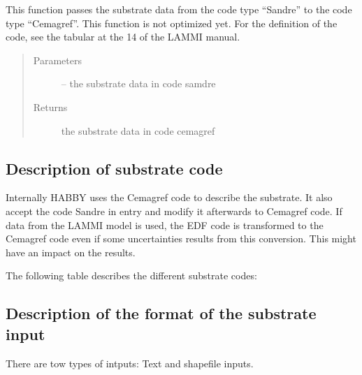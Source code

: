 \documentclass[letterpaper,10pt,english]{sphinxmanual}
\begin{document}

\begin{fulllineitems}
\label{\detokenize{index:src.substrate.sandre_to_cemagref}}
This function passes the substrate data from the code type ``Sandre'' to the code type ``Cemagref''. This function is
not optimized yet. For the definition of the code, see the tabular at the 14 of the LAMMI manual.
\begin{quote}\begin{description}
\item[{Parameters}] \leavevmode
{} -- the substrate data in code samdre

\item[{Returns}] \leavevmode
the substrate data in code cemagref

\end{description}\end{quote}

\end{fulllineitems}



\subsection{Description of substrate code}
\label{\detokenize{index:description-of-substrate-code}}
Internally HABBY uses the Cemagref code to describe the substrate. It also accept the code Sandre in entry and modify it afterwards to Cemagref code. If data from the LAMMI model is used, the EDF code is transformed to the Cemagref code even if some uncertainties results from this conversion. This might have an impact on the results.

The following table describes the different substrate codes:
\begin{figure}[htbp]
\centering

\noindent{}
\end{figure}


\subsection{Description of the format of the substrate input}
\label{\detokenize{index:description-of-the-format-of-the-substrate-input}}
There are tow types of intputs: Text and shapefile inputs.
\end{document}

